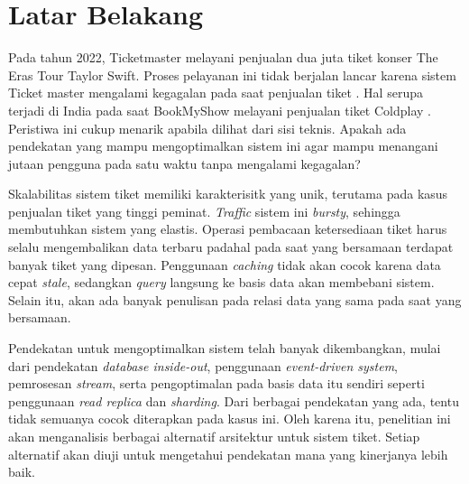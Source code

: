 \section{Latar Belakang}
\label{sec:latar-belakang}

Pada tahun 2022, Ticketmaster melayani penjualan dua juta tiket konser The Eras Tour Taylor Swift. Proses pelayanan ini tidak berjalan lancar karena sistem Ticket master mengalami kegagalan pada saat penjualan tiket \parencite{swiftTicketmaster}. Hal serupa terjadi di India pada saat BookMyShow melayani penjualan tiket Coldplay \parencite{coldplayBookMyShow}. Peristiwa ini cukup menarik apabila dilihat dari sisi teknis. Apakah ada pendekatan yang mampu mengoptimalkan sistem ini agar mampu menangani jutaan pengguna pada satu waktu tanpa mengalami kegagalan?

Skalabilitas sistem tiket memiliki karakterisitk yang unik, terutama pada kasus penjualan tiket yang tinggi peminat. \textit{Traffic} sistem ini \textit{bursty}, sehingga membutuhkan sistem yang elastis. Operasi pembacaan ketersediaan tiket harus selalu mengembalikan data terbaru padahal pada saat yang bersamaan terdapat banyak tiket yang dipesan. Penggunaan \textit{caching} tidak akan cocok karena data cepat \textit{stale}, sedangkan \textit{query} langsung ke basis data akan membebani sistem. Selain itu, akan ada banyak penulisan pada relasi data yang sama pada saat yang bersamaan.

Pendekatan untuk mengoptimalkan sistem telah banyak dikembangkan, mulai dari pendekatan \textit{database inside-out}, penggunaan \textit{event-driven system}, pemrosesan \textit{stream}, serta pengoptimalan pada basis data itu sendiri seperti penggunaan \textit{read replica} dan \textit{sharding}. Dari berbagai pendekatan yang ada, tentu tidak semuanya cocok diterapkan pada kasus ini. Oleh karena itu, penelitian ini akan menganalisis berbagai alternatif arsitektur untuk sistem tiket. Setiap alternatif akan diuji untuk mengetahui pendekatan mana yang kinerjanya lebih baik.